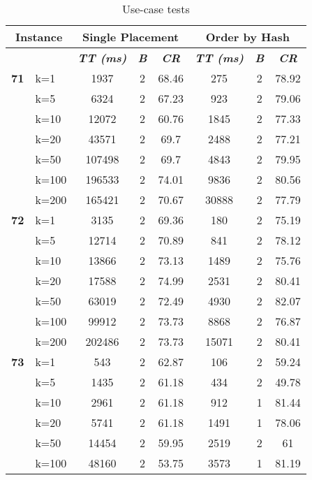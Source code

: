     \begin{table}[htbp]
    \caption{Use-case tests}
    \centering
    \begin{tabular}{|l|l|c|c|c|c|c|c|}
    
    \multicolumn{ 2}{|c|}{\textbf{Instance}} & \multicolumn{ 3}{c|}{\textbf{Single Placement}} & \multicolumn{ 3}{c|}{\textbf{Order by Hash}} \\ \hline
    \multicolumn{ 2}{|l|}{} & \textbf{\textit{TT (ms)}} & \textbf{\textit{B}} & \textbf{\textit{CR}} & \textbf{\textit{TT (ms)}} & \textbf{\textit{B}} & \textbf{\textit{CR}} \\ \hline
    \multicolumn{1}{|r|}{\textbf{71}} & k=1 & 1937 & 2 & 68.46 & 275 & 2 & 78.92 \\ 
     & k=5 & 6324 & 2 & 67.23 & 923 & 2 & 79.06 \\ 
     & k=10 & 12072 & 2 & 60.76 & 1845 & 2 & 77.33 \\ 
     & k=20 & 43571 & 2 & 69.7 & 2488 & 2 & 77.21 \\ 
     & k=50 & 107498 & 2 & 69.7 & 4843 & 2 & 79.95 \\ 
     & k=100 & 196533 & 2 & 74.01 & 9836 & 2 & 80.56 \\ 
     & k=200 & 165421 & 2 & 70.67 & 30888 & 2 & 77.79 \\ \hline
    \multicolumn{1}{|r|}{\textbf{72}} & k=1 & 3135 & 2 & 69.36 & 180 & 2 & 75.19 \\ 
     & k=5 & 12714 & 2 & 70.89 & 841 & 2 & 78.12 \\ 
     & k=10 & 13866 & 2 & 73.13 & 1489 & 2 & 75.76 \\ 
     & k=20 & 17588 & 2 & 74.99 & 2531 & 2 & 80.41 \\ 
     & k=50 & 63019 & 2 & 72.49 & 4930 & 2 & 82.07 \\ 
     & k=100 & 99912 & 2 & 73.73 & 8868 & 2 & 76.87 \\ 
     & k=200 & 202486 & 2 & 73.73 & 15071 & 2 & 80.41 \\ \hline
    \multicolumn{1}{|r|}{\textbf{73}} & k=1 & 543 & 2 & 62.87 & 106 & 2 & 59.24 \\ 
     & k=5 & 1435 & 2 & 61.18 & 434 & 2 & 49.78 \\ 
     & k=10 & 2961 & 2 & 61.18 & 912 & 1 & 81.44 \\ 
     & k=20 & 5741 & 2 & 61.18 & 1491 & 1 & 78.06 \\ 
     & k=50 & 14454 & 2 & 59.95 & 2519 & 2 & 61 \\ 
     & k=100 & 48160 & 2 & 53.75 & 3573 & 1 & 81.19 \\ 

\end{tabular}
\end{table}

